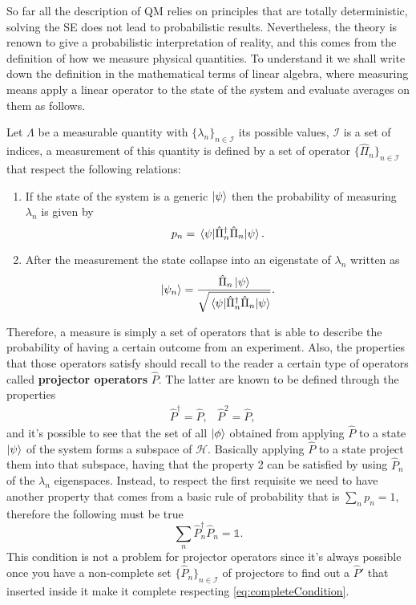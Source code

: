 So far all the description of QM relies on principles that are totally deterministic, solving the SE does not lead to probabilistic results. Nevertheless, the theory is renown to give a probabilistic interpretation of reality, and this comes from the definition of how we measure physical quantities. To understand it we shall write down the definition in the mathematical terms of linear algebra, where measuring means apply a linear operator to the state of the system and evaluate averages on them as follows.
{
    Let $\Lambda$ be a measurable quantity with $\{ \lambda_n \}_{n\in \mathcal{I}}$ its possible values, $\mathcal{I}$ is a set of indices, a measurement of this quantity is defined by a set of operator $\{ \hat{\Pi}_n \}_{n\in \mathcal{I}}$ that respect the following relations:
    \begin{enumerate}
        \item If the state of the system is a generic $\ket{\psi}$ then the probability of measuring $\lambda_n$ is given by
            \begin{equation}
                p_n = \ev{\hat{\Pi}^\dagger_n\hat{\Pi}_n}{\psi}.
            \end{equation}
        \item After the measurement the state collapse into an eigenstate of $\lambda_n$ written as
            \begin{equation}
                \ket{\psi_n} = \frac{\hat{\Pi}_n\ket{\psi}}{\sqrt{\ev{\hat{\Pi}^\dagger_n\hat{\Pi}_n}{\psi}}}.
            \end{equation}
    \end{enumerate}
}
\noindent
Therefore, a measure is simply a set of operators that is able to describe the probability of having a certain outcome from an experiment. Also, the properties that those operators satisfy should recall to the reader a certain type of operators called \textbf{projector operators} $\hat{P}$. The latter are known to be defined through the properties
\begin{align}
    \label{eq:ProjDef}
    &\hat{P}^\dagger = \hat{P}, & \hat{P}^2 = \hat{P},
\end{align}
and it's possible to see that the set of all $\ket{\phi}$ obtained from applying $\hat{P}$ to a state $\ket{\psi}$ of the system forms a subspace of $\mathcal{H}$. Basically applying $\hat{P}$ to a state project them into that subspace, having that the property 2 can be satisfied by using $\hat{P}_n$ of the $\lambda_n$ eigenspaces. Instead, to respect the first requisite we need to have another property that comes from a basic rule of probability that is $\sum_n p_n = 1$, therefore the following must be true
\begin{equation}
    \label{eq:completeCondition}
    \sum_n \hat{P}^\dagger_n\hat{P}_n = \mathbb{1}.
\end{equation}
This condition is not a problem for projector operators since it's always possible once you have a non-complete set $\{ \hat{P}_n \}_{n\in \mathcal{I}}$ of projectors to find out a $\hat{P}'$ that inserted inside it make  it complete respecting \eqref{eq:completeCondition}.


